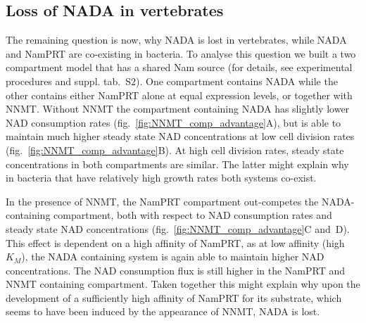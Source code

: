 \subsection{Loss of NADA in vertebrates}

The remaining question is now, why NADA is lost in vertebrates, while NADA and NamPRT are co-existing in bacteria. To analyse this question we built a two compartment model that has a shared Nam source (for details, see experimental procedures and suppl. tab.~S2). One compartment contains NADA while the other contains either NamPRT alone at equal expression levels, or together with NNMT. Without NNMT the compartment containing NADA has slightly lower NAD consumption rates (fig.~\ref{fig:NNMT_comp_advantage}A), but is able to maintain much higher steady state NAD concentrations at low cell division rates (fig.~\ref{fig:NNMT_comp_advantage}B). At high cell division rates, steady state concentrations in both compartments are similar. The latter might explain why in bacteria that have relatively high growth rates both systems co-exist.

In the presence of NNMT, the NamPRT compartment out-competes the NADA-containing compartment, both with respect to NAD consumption rates and steady state NAD concentrations (fig.~\ref{fig:NNMT_comp_advantage}C and~D). This effect is dependent on a high affinity of NamPRT, as at low affinity (high $K_{M}$), the NADA containing system is again able to maintain higher NAD concentrations. The NAD consumption flux is still higher in the NamPRT and NNMT containing compartment. Taken together this might explain why upon the development of a sufficiently high affinity of NamPRT for its substrate, which seems to have been induced by the appearance of NNMT, NADA is lost.
